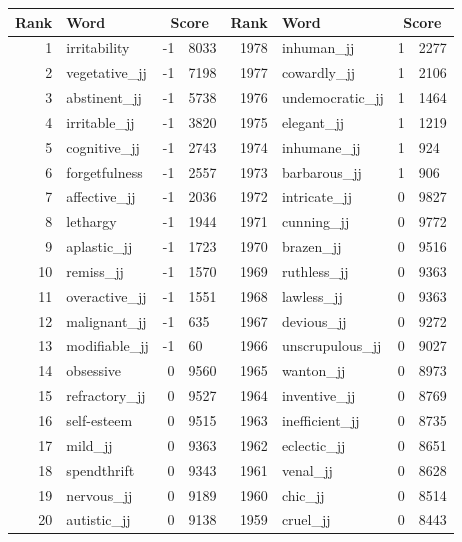 \begin{table}[tbp]
    \begin{tabular}{| rlr@{.}l | rlr@{.}l |}
    \hline
    \textbf{Rank} & \textbf{Word} & \multicolumn{2}{c|}{\textbf{Score}} & \textbf{Rank} & \textbf{Word} & \multicolumn{2}{c|}{\textbf{Score}} \\
    \hline
    1 & irritability & -1 & 8033    &    1978 & inhuman\_jj & 1 & 2277 \\
    2 & vegetative\_jj & -1 & 7198    &    1977 & cowardly\_jj & 1 & 2106 \\
    3 & abstinent\_jj & -1 & 5738    &    1976 & undemocratic\_jj & 1 & 1464 \\
    4 & irritable\_jj & -1 & 3820    &    1975 & elegant\_jj & 1 & 1219 \\
    5 & cognitive\_jj & -1 & 2743    &    1974 & inhumane\_jj & 1 & 924 \\
    6 & forgetfulness & -1 & 2557    &    1973 & barbarous\_jj & 1 & 906 \\
    7 & affective\_jj & -1 & 2036    &    1972 & intricate\_jj & 0 & 9827 \\
    8 & lethargy & -1 & 1944    &    1971 & cunning\_jj & 0 & 9772 \\
    9 & aplastic\_jj & -1 & 1723    &    1970 & brazen\_jj & 0 & 9516 \\
    10 & remiss\_jj & -1 & 1570    &    1969 & ruthless\_jj & 0 & 9363 \\
    11 & overactive\_jj & -1 & 1551    &    1968 & lawless\_jj & 0 & 9363 \\
    12 & malignant\_jj & -1 & 635    &    1967 & devious\_jj & 0 & 9272 \\
    13 & modifiable\_jj & -1 & 60    &    1966 & unscrupulous\_jj & 0 & 9027 \\
    14 & obsessive & 0 & 9560    &    1965 & wanton\_jj & 0 & 8973 \\
    15 & refractory\_jj & 0 & 9527    &    1964 & inventive\_jj & 0 & 8769 \\
    16 & self-esteem & 0 & 9515    &    1963 & inefficient\_jj & 0 & 8735 \\
    17 & mild\_jj & 0 & 9363    &    1962 & eclectic\_jj & 0 & 8651 \\
    18 & spendthrift & 0 & 9343    &    1961 & venal\_jj & 0 & 8628 \\
    19 & nervous\_jj & 0 & 9189    &    1960 & chic\_jj & 0 & 8514 \\
    20 & autistic\_jj & 0 & 9138    &    1959 & cruel\_jj & 0 & 8443 \\

\end{tabular}
\end{table}
